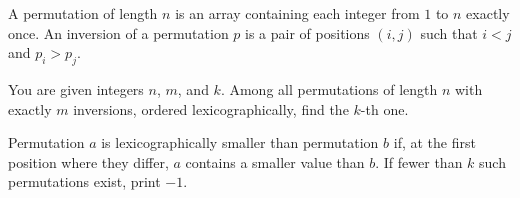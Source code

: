 A permutation of length $n$ is an array containing each integer from $1$ to $n$ exactly once.
An inversion of a permutation $p$ is a pair of positions $(i,j)$ such that $i<j$ and $p_i>p_j$.

You are given integers $n$, $m$, and $k$. Among all permutations of length $n$ with exactly $m$ inversions, ordered lexicographically, find the $k$-th one.

Permutation $a$ is lexicographically smaller than permutation $b$ if, at the first position where they differ, $a$ contains a smaller value than $b$.
If fewer than $k$ such permutations exist, print $-1$.

